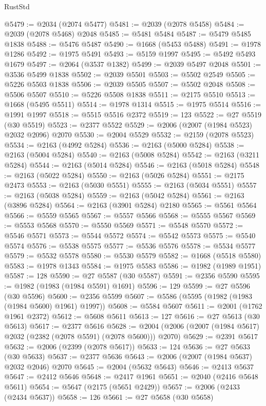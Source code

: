 \begin{lexlean}{RustStd}
\begin{coremodule}
@5479 := @2034 (@2074 @5477)
@5481 := @2039 (@2078 @5458)
@5484 := @2039 (@2078 @5468) @2048
@5485 := @5481 @5484
@5487 := @5479 @5485 @1838
@5488 := @5476 @5487
@5490 := @1668 (@5453 @5488)
@5491 := @1978 @1286
@5492 := @1975 @5491
@5493 := @5159 @1997
@5495 := @5492 @5493 @1679
@5497 := @2064 (@3537 @1382)
@5499 := @2039 @5497 @2048
@5501 := @3536 @5499 @1838
@5502 := @2039 @5501
@5503 := @5502 @2549
@5505 := @5226 @5503 @1838
@5506 := @2039 @5505
@5507 := @5502 @2048
@5508 := @5506 @5507
@5510 := @5226 @5508 @1838
@5511 := @2175 @5510
@5513 := @1668 (@5495 @5511)
@5514 := @1978 @1314
@5515 := @1975 @5514
@5516 := @1991 @1997
@5518 := @5515 @5516 @2372
@5519 := 123
@5522 := @27 @5519 (@30 @5519)
@5523 := @2377 @5522
@5529 := @2006 (@2007 (@1984 @5523) @2032 @2096) @2070
@5530 := @2004 @5529
@5532 := @2159 (@2078 @5523)
@5534 := @2163 (@4992 @5284)
@5536 := @2163 (@5000 @5284)
@5538 := @2163 (@5004 @5284)
@5540 := @2163 (@5008 @5284)
@5542 := @2163 (@3211 @5284)
@5544 := @2163 (@5014 @5284)
@5546 := @2163 (@5018 @5284)
@5548 := @2163 (@5022 @5284)
@5550 := @2163 (@5026 @5284)
@5551 := @2175 @2473
@5553 := @2163 (@5030 @5551)
@5555 := @2163 (@5034 @5551)
@5557 := @2163 (@5038 @5284)
@5559 := @2163 (@5042 @5284)
@5561 := @2163 (@3896 @5284)
@5564 := @2163 (@3901 @5284) @2180
@5565 := @5561 @5564
@5566 := @5559 @5565
@5567 := @5557 @5566
@5568 := @5555 @5567
@5569 := @5553 @5568
@5570 := @5550 @5569
@5571 := @5548 @5570
@5572 := @5546 @5571
@5573 := @5544 @5572
@5574 := @5542 @5573
@5575 := @5540 @5574
@5576 := @5538 @5575
@5577 := @5536 @5576
@5578 := @5534 @5577
@5579 := @5532 @5578
@5580 := @5530 @5579
@5582 := @1668 (@5518 @5580)
@5583 := @1978 @1343
@5584 := @1975 @5583
@5586 := @1982 (@1989 @1951)
@5587 := 128
@5590 := @27 @5587 (@30 @5587)
@5591 := @2356 @5590
@5595 := @1982 (@1983 (@1984 @5591) @1691)
@5596 := 129
@5599 := @27 @5596 (@30 @5596)
@5600 := @2356 @5599
@5607 := @5586 (@5595 (@1982 (@1983 (@1984 @5600) @1961) @1997))
@5608 := @5584 @5607
@5611 := @2001 (@1762 @1961 @2372)
@5612 := @5608 @5611
@5613 := 127
@5616 := @27 @5613 (@30 @5613)
@5617 := @2377 @5616
@5628 := @2004 (@2006 (@2007 (@1984 @5617) @2032 (@2382 (@2078 @5591) (@2078 @5600))) @2070)
@5629 := @2391 @5617
@5632 := @2006 (@2399 (@2078 @5617))
@5633 := 124
@5636 := @27 @5633 (@30 @5633)
@5637 := @2377 @5636
@5643 := @2006 (@2007 (@1984 @5637) @2032 @2046) @2070
@5645 := @2004 (@5632 @5643)
@5646 := @2413 @5637
@5647 := @2412 @5646
@5648 := @2417 @1961
@5651 := @2040 (@2416 @5648 @5611)
@5654 := @5647 (@2175 (@5651 @2429))
@5657 := @2006 (@2433 (@2434 @5637))
@5658 := 126
@5661 := @27 @5658 (@30 @5658)

\end{coremodule}
\end{lexlean}
